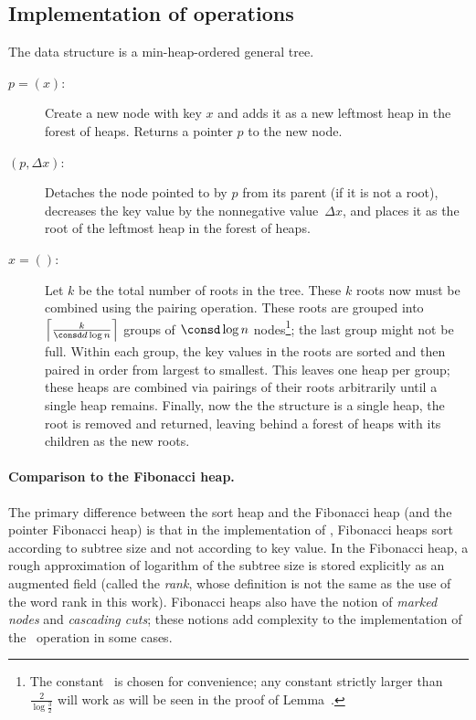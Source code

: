 \begin{fullonly}
\subsection{Implementation of operations}

The data structure is a min-heap-ordered general tree. 

\begin{description}

\item[$p=$\opIns$(x)$:] Create a new node with key $x$ and adds it as a new leftmost heap in the forest of heaps. Returns a pointer $p$ to the new node.

\item[\opDc$(p,\Delta x)$:] Detaches the node pointed to by $p$ from its parent (if it is not a root), decreases the key value by the nonnegative value~$\Delta x$, and places it as the root of the leftmost heap in the forest of heaps.

\item[$x=$\opEm$()$:] 
 Let $k$ be the total number of roots in the tree. These $k$ roots now must be combined using the pairing operation. These roots are grouped into $\left \lceil \frac{k}{\consd d \log n} \right \rceil$ groups of $ \consd \log n$  nodes\footnote{The constant \consd\ is chosen for convenience; any constant strictly larger than $\frac{2}{\log \frac32}$ will work as will be seen in the proof of Lemma~.}; the last group might not be full. Within each group, the key values in the roots are sorted and then paired in order from largest to smallest. This leaves one heap per group; these heaps are combined via pairings of their roots arbitrarily until a single heap remains. Finally, now the the structure is a single heap, the root is removed and returned, leaving behind a forest of heaps with its children as the new roots.
 
\end{description}



\paragraph{Comparison to the Fibonacci heap.} 
The primary difference between the sort heap and the Fibonacci heap (and the pointer Fibonacci heap) is that in the implementation of \opEm, Fibonacci heaps sort according to subtree size and not according to key value. In the Fibonacci heap, a rough approximation of logarithm of the subtree size is stored explicitly as an augmented field (called the \emph{rank}, whose definition is not the same as the use of the word rank in this work). Fibonacci heaps also have the notion of \emph{marked nodes} and \emph{cascading cuts}; these notions add complexity to the implementation of the \opDc\ operation in some cases.



\end{fullonly}

